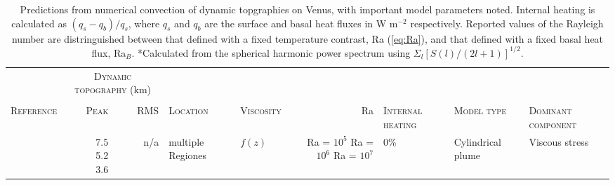  



























\begin{landscape}
\thispagestyle{empty}

\footnotesize


\begin{longtable}{ @{} p{4cm} r r p{2cm} p{2cm} r p{1.5cm} p{3.2cm} p{3.1cm} @{} } 
\caption{Predictions from numerical convection of dynamic topgraphies on Venus, with important model parameters noted. Internal heating is calculated as $(q_s - q_b)/q_s$, where $q_s$ and $q_b$ are the surface and basal heat fluxes in W m$^{-2}$ respectively. Reported values of the Rayleigh number are distringuished between that defined with a fixed temperature contrast, Ra (\ref{eq:Ra}), and that defined with a fixed basal heat flux, Ra$_B$. \;\;  *Calculated from the spherical harmonic power spectrum using $\Sigma_l [S(l)/(2l + 1)]^{1/2}$.} \label{tab:dyn_topo_obvs}\\



\toprule
\; & \multicolumn{2}{c}{\textsc{Dynamic topography} (km)} \\
\cline{2-3} \\
\textsc{Reference} & \textsc{Peak} & \textsc{RMS} & \textsc{Location} & \textsc{Viscosity} & Ra & \textsc{Internal heating} & \textsc{Model type} & \textsc{Dominant component}\\
\midrule 

\citet{Kiefer1991} & \makecell[tr]{7.5 \\ 5.2 \\ 3.6} & n/a  & multiple Regiones &  $f(z)$ & \makecell[tr]{Ra = $10^5$ \\ Ra = $10^6$ \\ Ra = $10^7$} & 0\% & Cylindrical plume & Viscous stress  \\





\end{longtable}
\end{landscape}
